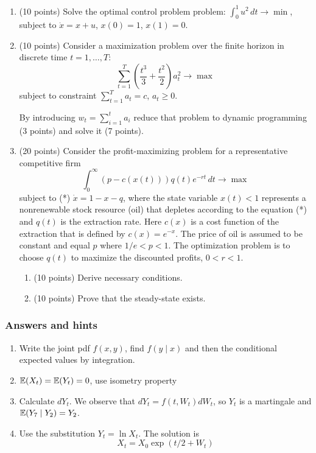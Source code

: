 \documentclass[pdftex,12pt,a4paper]{article}
\begin{document}
\begin{enumerate}[resume]
\item (10 points) Solve the optimal control problem problem: $\int_0^1 u^2 \, dt \to \min$, subject to $\dot{x}=x+u$, $x(0)=1$, $x(1)=0$.
\item (10 points) Consider a maximization problem over the finite horizon in discrete time $t=1,\ldots,T$:
\[
\sum_{t=1}^{T} \left(\frac{t^3}{3}+\frac{t^2}{2}\right)a_t^2 \to \max
\] 
subject to constraint $\sum_{t=1}^T a_t=c$, $a_t \geq 0$.  

By introducing $w_t=\sum_{i=1}^t a_i$  reduce that problem to dynamic programming (3 points) and solve it (7 points).  

\item (20 points) Consider the profit-maximizing problem for a representative competitive firm 
\[
\int_0^{\infty} (p-c(x(t)))q(t)e^{-rt} \, dt \to \max
\]
subject to (*) $\dot{x}=1-x-q$, where the state variable  $x(t)<1$ represents a nonrenewable stock resource (oil) that depletes according to the equation (*) and $q(t)$ is the extraction rate. Here $c(x)$ is a cost function of the extraction that is defined by $c(x)=e^{-x}$. The price of oil is assumed to be constant and equal $p$ where $1/e<p<1$.  The optimization problem is to choose $q(t)$ to maximize the discounted profits, $0<r<1$.
\begin{enumerate}
\item (10 points) Derive necessary conditions.
\item (10 points) Prove that the steady-state exists.
\end{enumerate}
\end{enumerate}

\subsubsection*{Answers and hints}
\begin{enumerate}
\item Write the joint pdf $f(x,y)$, find $f(y \mid x)$ and then the conditional expected values by integration.
\item $\mathbb{E}(X_t)=\mathbb{E}(Y_t)=0$, use isometry property
\item Calculate  $dY_t$. We observe that $dY_t=f(t,W_t)dW_t$, so $Y_t$ is a martingale and $\mathbb{E}(Y_7 \mid Y_2)=Y_2$.
\item Use the substitution $Y_t=\ln X_t$. The solution is 
\[
X_t=X_0\exp(t/2+W_t)
\]
\end{enumerate}
\end{document}
